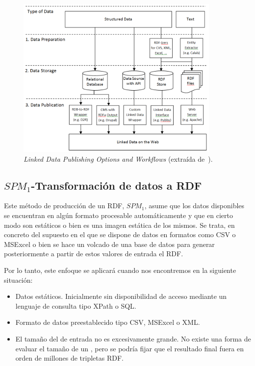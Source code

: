 \begin{figure}[!htb]
\centering
	\includegraphics[width=10cm]{images/phd/linkeddata}
\caption{\textit{Linked Data Publishing Options and Workflows} (extraída de~\cite{Heath_Bizer_2011}).}
\label{fig:produccion}
\end{figure}


\subsection{$SPM_1$-Transformación de datos a RDF}\label{spm-1}
Este método de producción de un \dataset \gls{RDF}, $SPM_1$, asume que los datos disponibles se encuentran
en algún formato procesable automáticamente y que en cierto modo son estáticos o bien
es una imagen estática de los mismos. Se trata, en concreto del supuesto en el que se dispone de datos en formatos
como \gls{CSV} o MSExcel o bien se hace un volcado de una base de datos para generar posteriormente a partir
de estos valores de entrada el \dataset RDF. 

Por lo tanto, este enfoque se aplicará cuando nos encontremos en la siguiente situación:
\begin{itemize}
 \item Datos estáticos. Inicialmente sin disponibilidad de acceso mediante un lenguaje de consulta tipo \gls{XPath} o \gls{SQL}.
 \item Formato de datos preestablecido tipo CSV, MSExcel o \gls{XML}.
 \item El tamaño del \dataset de entrada no es excesivamente grande. No existe una forma de evaluar el tamaño
de un \dataset, pero se podría fijar que el resultado final fuera en orden de millones de tripletas RDF.
\end{itemize}


